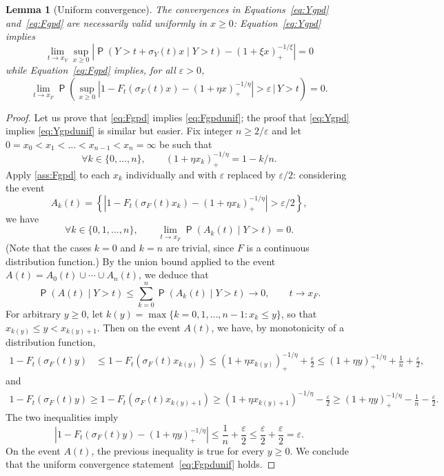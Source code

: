 \documentclass[12pt]{article}
\newcommand{\Q}{\operatorname{\mathsf{P}}}
\newcommand{\1}{\mathbf{1}} %
\newcommand{\eps}{\varepsilon}
\newtheorem{lemma}[propo]{Lemma}
\theoremstyle{definition}
\begin{document}
\begin{lemma}[Uniform convergence]
\label{lem:unifconv}
The convergences in Equations~\eqref{eq:Ygpd} and~\eqref{eq:Fgpd} are necessarily valid uniformly in $x \ge 0$: Equation~\eqref{eq:Ygpd} implies
\begin{equation}
	\label{eq:Ygpdunif}
	\lim_{t \to x_Y} \sup_{x \ge 0}
	\left|
		\Q \left( Y > t + \sigma_Y(t)x \mid Y > t \right)
		- (1 + \xi x)_+^{-1/\xi}
	\right|
	= 0
\end{equation}
while Equation~\eqref{eq:Fgpd} implies, for all $\eps > 0$,
\begin{equation}
	\label{eq:Fgpdunif}
	\lim_{t \to x_F} \Q \left(
		\sup_{x \ge 0}
		\left|
		1 - F_t(\sigma_F(t)x) - (1+\eta x)_+^{-1/\eta}
		\right|
		> \eps
	\, \Bigg| \,
	Y > t
	\right)
	= 0.
\end{equation}
\end{lemma}

\begin{proof}
Let us prove that \eqref{eq:Fgpd} implies \eqref{eq:Fgpdunif}; the proof that \eqref{eq:Ygpd} implies \eqref{eq:Ygpdunif} is similar but easier. Fix integer $n \ge 2/\eps$ and let $0 = x_0 < x_1 < \ldots < x_{n-1} < x_n = \infty$ be such that
\[
	\forall k \in \{0,\ldots,n\}, \qquad
	(1+\eta x_k)_+^{-1/\eta} = 1 - k/n.
\]
Apply \ref{ass:Fgpd} to each $x_k$ individually and with $\eps$ replaced by $\eps/2$: considering the event
\[
	A_k(t) = \left\{ 
		\left| 
			1 - F_t(\sigma_F(t)x_k) 
			- (1 + \eta x_k)_+^{-1/\eta} 
		\right| 
		> \eps/2
	\right\},
\]
we have
\[
	\forall k \in \{0,1,\ldots,n\}, \qquad
	\lim_{t \to x_F}
	\Q \left( A_k(t) \mid Y > t \right)
	= 0.
\]
(Note that the cases $k = 0$ and $k = n$ are trivial, since $F$ is a continuous distribution function.)
By the union bound applied to the event $A(t) = A_0(t) \cup \cdots \cup A_n(t)$, we deduce that
\[
	\Q \left( 
		A(t) \mid Y > t
	\right)
	\le 
	\sum_{k=0}^n \Q \left( A_k(t) \mid Y > t \right)
	\to 0, \qquad t \to x_F.
\]
For arbitrary $y \ge 0$, let $k(y) = \max \{ k = 0,1,\ldots,n-1 : x_k \le y \}$, so that $x_{k(y)} \le y < x_{k(y)+1}$. Then on the event $A(t)$, we have, by monotonicity of a distribution function,
\begin{align*}
	1 - F_t(\sigma_F(t)y)
	&\le 1 - F_t(\sigma_F(t)x_{k(y)}) \le (1+\eta x_{k(y)})_+^{-1/\eta} + \frac{\eps}{2} \le (1+\eta y)_+^{-1/\eta} + \frac{1}{n} + \frac{\eps}{2},
\end{align*}
and
\begin{align*}
	1 - F_t(\sigma_F(t)y) \ge 1 - F_t(\sigma_F(t) x_{k(y)+1}) \ge (1+\eta x_{k(y)+1})^{-1/\eta} - \frac{\eps}{2} \ge (1+\eta y)_+^{-1/\eta} - \frac{1}{n} - \frac{\eps}{2}.
\end{align*}
The two inequalities imply
\[
	\left|
		1 - F_t(\sigma_F(t)y)
		-
		(1+\eta y)_+^{-1/\eta}
	\right|
	\le \frac{1}{n} + \frac{\eps}{2}
	\le  \frac{\eps}{2} +  \frac{\eps}{2}
	= \eps.
\]
On the event $A(t)$, the previous inequality is true for every $y \ge 0$. We conclude that the uniform convergence statement~\eqref{eq:Fgpdunif} holds.
\end{proof}
\end{document}
